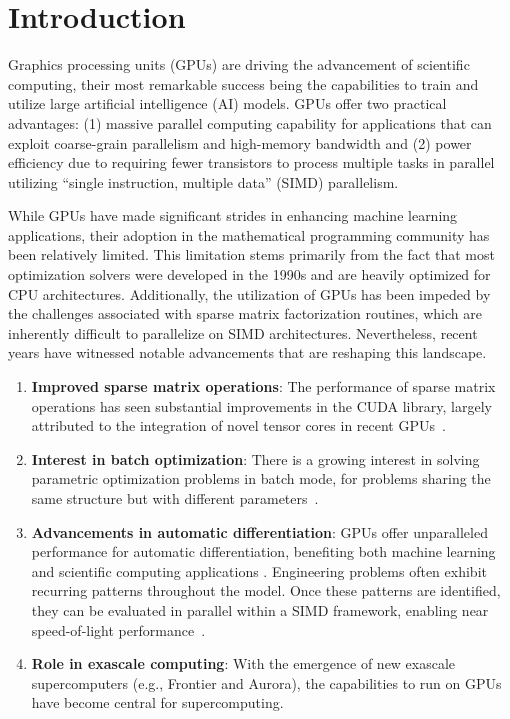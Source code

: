 \section{Introduction}
Graphics processing units (GPUs) are driving the advancement of scientific computing, their most remarkable success being the capabilities to train and utilize large artificial intelligence (AI) models.
GPUs offer two practical advantages: (1) massive parallel computing capability for applications that can exploit coarse-grain parallelism and high-memory bandwidth and (2) power efficiency due to requiring fewer transistors to process multiple tasks in parallel utilizing ``single instruction, multiple data'' (SIMD) parallelism.

While GPUs have made significant strides in enhancing machine learning applications, their adoption in the mathematical programming community has been relatively limited.
This limitation stems primarily from the fact that most optimization solvers were developed in the 1990s and are heavily optimized for CPU architectures.
Additionally, the utilization of GPUs has been impeded by the challenges associated with sparse matrix factorization routines, which are inherently difficult to parallelize on SIMD architectures. Nevertheless, recent years have witnessed notable advancements that are reshaping this landscape.
\begin{enumerate}
  \item \textbf{Improved sparse matrix operations}: The performance of sparse matrix operations has seen substantial improvements in the CUDA library, largely attributed to the integration of novel tensor cores in recent GPUs~\cite{markidis2018nvidia}.
  \item \textbf{Interest in batch optimization}: There is a growing interest in solving parametric optimization problems in batch mode, for problems sharing the same structure but with different parameters~\cite{amos2017optnet,pineda2022theseus}.
  \item \textbf{Advancements in automatic differentiation}: GPUs offer unparalleled performance for automatic differentiation, benefiting both machine learning~\cite{jax2018github} and scientific computing applications \cite{enzyme2021}. Engineering problems often exhibit recurring patterns throughout the model. Once these patterns are identified, they can be evaluated in parallel within a SIMD framework, enabling near speed-of-light performance~\cite{shin2023accelerating}.
  \item \textbf{Role in exascale computing}: With the emergence of new exascale supercomputers (e.g., Frontier and Aurora), the capabilities to run on GPUs have become central for supercomputing.
\end{enumerate}

